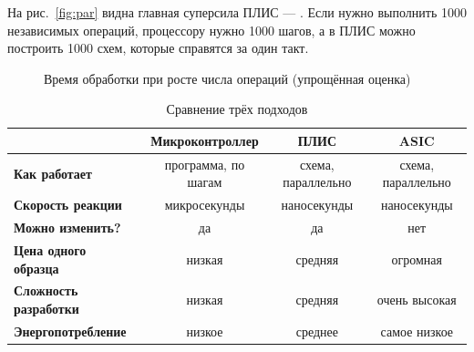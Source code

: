 На рис.~\ref{fig:par} видна главная суперсила ПЛИС --- .
Если нужно выполнить 1000 независимых операций, процессору нужно
1000 шагов, а в ПЛИС можно построить 1000 схем, которые справятся за один
такт.

\begin{figure}[H]
\centering
{}
\caption{Время обработки при росте числа операций (упрощённая оценка)}
\end{figure}

\begin{table}[H]
\centering
\caption{Сравнение трёх подходов}
\small
\begin{tabularx}{\textwidth}{>{\bfseries}X c c c}
\toprule
 & \textbf{Микроконтроллер} & \textbf{ПЛИС} & \textbf{ASIC} \\
\midrule
Как работает          & программа, по шагам & схема, параллельно & схема, параллельно \\
Скорость реакции      & микросекунды        & наносекунды        & наносекунды \\
Можно изменить?       & да                  & да                 & нет \\
Цена одного образца   & низкая              & средняя            & огромная \\
Сложность разработки  & низкая              & средняя            & очень высокая \\
Энергопотребление     & низкое              & среднее            & самое низкое \\
\bottomrule
\end{tabularx}
\end{table}


